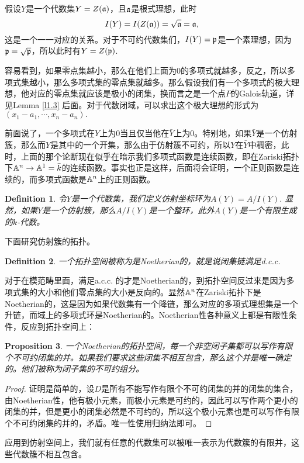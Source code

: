 \documentclass[9pt]{extarticle}
\theoremstyle{plain}%
\newtheorem{defi}{Definition}[section]%
\newtheorem{pro}[defi]{Proposition}%
\begin{document}
假设$Y$是一个代数集$Y=Z(\mathfrak{a})$，且$\mathfrak{a}$是根式理想，此时
\[
I(Y)=I(Z(\mathfrak{a}))=\sqrt{\mathfrak{a}}=\mathfrak{a},
\]
这是一个一一对应的关系。对于不可约代数集们，$I(Y)=\mathfrak{p}$是一个素理想，因为$\mathfrak{p}=\sqrt{\mathfrak{p}}$，所以此时有$Y=Z(\mathfrak{p})$.

容易看到，如果零点集越小，那么在他们上面为0的多项式就越多，反之，所以多项式集越小，那么多项式集的零点集就越多。那么假设我们有一个多项式的极大理想，他对应的零点集就应该是极小的闭集，换而言之是一个点$P$的Galois轨道，详见Lemma \ref{l1.3} 后面。对于代数闭域，可以求出这个极大理想的形式为$(x_1-a_1,\cdots,x_n-a_n).$

前面说了，一个多项式在$Y$上为$0$当且仅当他在$\bar{Y}$上为$0$。特别地，如果$\bar{Y}$是一个仿射簇，那么而$Y$是其中的一个开集，那么由于仿射簇不可约，所以$Y$在$\bar{Y}$中稠密，此时，上面的那个论断现在似乎在暗示我们多项式函数是连续函数，即在Zariski拓扑下$\mathbb{A}^n\to \mathbb{A}^1=\bar{k}$的连续函数。事实也正是这样，后面将会证明，一个正则函数是连续的，而多项式函数是$\mathbb{A}^n$上的正则函数。

\begin{defi}
令$Y$是一个代数集，我们定义仿射坐标环为$A(Y)=A/I(Y)$.
显然，如果$Y$是一个仿射簇，那么$A/I(Y)$是一个整环，此外$A(Y)$是一个有限生成的$k$-代数。
\end{defi}

下面研究仿射簇的拓扑。

\begin{defi}
	一个拓扑空间被称为是Noetherian的，就是说闭集链满足d.c.c.
\end{defi}
对于在模范畴里面，满足a.c.c.
的才是Noetherian的，到拓扑空间反过来是因为多项式集的大小和他们零点集的大小是反向的。显然$\mathbb{A}^n$在Zariski拓扑下是Noetherian的，这是因为如果代数集有一个降链，那么对应的多项式理想集是一个升链，而域上的多项式环是Noetherian的。Noetherian性各种意义上都是有限性条件，反应到拓扑空间上：

\begin{pro}
	一个Noetherian的拓扑空间，每一个非空闭子集都可以写作有限个不可约闭集的并。如果我们要求这些闭集不相互包含，那么这个并是唯一确定的。他们被称为闭子集的不可约组分。
\end{pro}
\begin{proof}
证明是简单的，设$D$是所有不能写作有限个不可约闭集的并的闭集的集合，由Noetherian性，他有极小元素，而极小元素是可约的，因此可以写作两个更小的闭集的并，但是更小的闭集必然是不可约的，所以这个极小元素也是可以写作有限个不可约闭集的并的，矛盾。唯一性使用归纳法即可。
\end{proof}
应用到仿射空间上，我们就有任意的代数集可以被唯一表示为代数簇的有限并，这些代数簇不相互包含。
\end{document}
